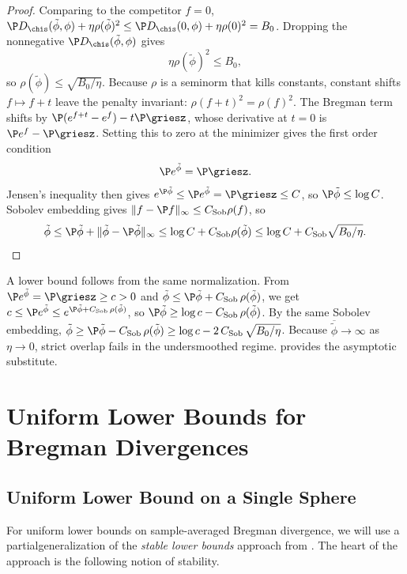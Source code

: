 \documentclass{article}
\begin{document}
\begin{proof}
Comparing to the competitor $f = 0$,
$\P D_{\chis}(\tilde\phi, \phi) + \eta \rho(\tilde\phi)^2
  \le \P D_{\chis}(0, \phi) + \eta\rho(0)^2 = B_0$.
Dropping the nonnegative $\P D_{\chis}(\tilde\phi, \phi)$ gives
\[
\eta \rho(\tilde\phi)^2 \le B_0,
\]
so $\rho(\tilde\phi) \le \sqrt{B_0/\eta}$. Because $\rho$ is a seminorm that kills constants, constant shifts $f \mapsto f + t$ leave the penalty invariant: $\rho(f+t)^2 = \rho(f)^2$. The Bregman term shifts by $\P(e^{f+t} - e^f) - t \P \griesz$, whose derivative at $t = 0$ is $\P e^f - \P \griesz$. Setting this to zero at the minimizer gives the first order condition
\[
\P e^{\tilde\phi} = \P \griesz.
\]
Jensen's inequality then gives $e^{\P \tilde\phi} \le \P e^{\tilde\phi} = \P \griesz \le C$, so $\P \tilde\phi \le \log C$. Sobolev embedding gives $\|f - \P f\|_\infty \le C_{\mathrm{Sob}} \rho(f)$, so
\[
\tilde\phi \le \P\tilde\phi + \|\tilde\phi - \P\tilde\phi\|_\infty \le \log C + C_{\mathrm{Sob}} \rho(\tilde\phi) \le \log C + C_{\mathrm{Sob}} \sqrt{B_0/\eta}.
\]
\end{proof}

A lower bound follows from the same normalization.
From $\P e^{\tilde\phi} = \P\griesz \ge c > 0$
and $\tilde\phi \le \P\tilde\phi + C_{\mathrm{Sob}}\,\rho(\tilde\phi)$,
we get
$c \le \P e^{\tilde\phi}
  \le e^{\P\tilde\phi + C_{\mathrm{Sob}}\,\rho(\tilde\phi)}$,
so $\P\tilde\phi
  \ge \log c - C_{\mathrm{Sob}}\,\rho(\tilde\phi)$.
By the same Sobolev embedding,
$\tilde\phi
  \ge \P\tilde\phi - C_{\mathrm{Sob}}\,\rho(\tilde\phi)
  \ge \log c - 2\,C_{\mathrm{Sob}}\,\sqrt{B_0/\eta}$.
Because $\overline{\tilde\phi} \to \infty$ as $\eta \to 0$, strict overlap fails in the undersmoothed regime.  provides the asymptotic substitute.


\section{Uniform Lower Bounds for Bregman Divergences}
\label{sec:uniform-lower-bounds}

\subsection{Uniform Lower Bound on a Single Sphere}

For uniform lower bounds on sample-averaged Bregman divergence,
we will use a partial\footnotemark generalization of the \emph{stable lower bounds} approach from \citet{mendelson2021extending}. The heart
of the approach is the following notion of stability.
\end{document}

